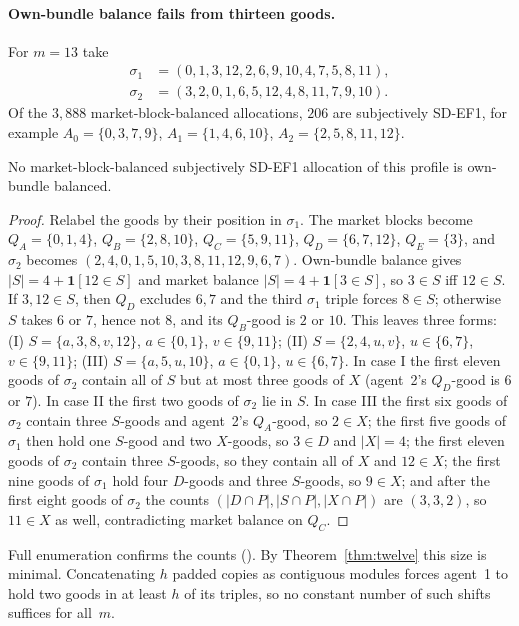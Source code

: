 \documentclass[sigconf,anonymous]{aamas}
\begin{document}
\paragraph{Own-bundle balance fails from thirteen goods.}
For $m=13$ take
\begin{align*}
 \sigma_1&=(0,1,3,12,2,6,9,10,4,7,5,8,11),\\
 \sigma_2&=(3,2,0,1,6,5,12,4,8,11,7,9,10).
\end{align*}
Of the $3{,}888$ market-block-balanced allocations, $206$ are subjectively SD-EF1, for example $A_0=\{0,3,7,9\}$, $A_1=\{1,4,6,10\}$, $A_2=\{2,5,8,11,12\}$.
\begin{proposition}\label{prop:thirteen}
No market-block-balanced subjectively SD-EF1 allocation of this profile is own-bundle balanced.
\end{proposition}
\begin{proof}
Relabel the goods by their position in $\sigma_1$. The market blocks become $Q_A=\{0,1,4\}$, $Q_B=\{2,8,10\}$, $Q_C=\{5,9,11\}$, $Q_D=\{6,7,12\}$, $Q_E=\{3\}$, and $\sigma_2$ becomes $(2,4,0,1,5,10,3,8,11,12,9,6,7)$. Own-bundle balance gives $|S|=4+\mathbf 1[12\in S]$ and market balance $|S|=4+\mathbf 1[3\in S]$, so $3\in S$ iff $12\in S$. If $3,12\in S$, then $Q_D$ excludes $6,7$ and the third $\sigma_1$ triple forces $8\in S$; otherwise $S$ takes $6$ or $7$, hence not $8$, and its $Q_B$-good is $2$ or $10$. This leaves three forms: (I) $S=\{a,3,8,v,12\}$, $a\in\{0,1\}$, $v\in\{9,11\}$; (II) $S=\{2,4,u,v\}$, $u\in\{6,7\}$, $v\in\{9,11\}$; (III) $S=\{a,5,u,10\}$, $a\in\{0,1\}$, $u\in\{6,7\}$. In case I the first eleven goods of $\sigma_2$ contain all of $S$ but at most three goods of $X$ (agent~2's $Q_D$-good is $6$ or $7$). In case II the first two goods of $\sigma_2$ lie in $S$. In case III the first six goods of $\sigma_2$ contain three $S$-goods and agent~2's $Q_A$-good, so $2\in X$; the first five goods of $\sigma_1$ then hold one $S$-good and two $X$-goods, so $3\in D$ and $|X|=4$; the first eleven goods of $\sigma_2$ contain three $S$-goods, so they contain all of $X$ and $12\in X$; the first nine goods of $\sigma_1$ hold four $D$-goods and three $S$-goods, so $9\in X$; and after the first eight goods of $\sigma_2$ the counts $(|D\cap P|,|S\cap P|,|X\cap P|)$ are $(3,3,2)$, so $11\in X$ as well, contradicting market balance on $Q_C$.
\end{proof}
Full enumeration confirms the counts (\appFifteen). By Theorem~\ref{thm:twelve} this size is minimal. Concatenating $h$ padded copies as contiguous modules forces agent~1 to hold two goods in at least $h$ of its triples, so no constant number of such shifts suffices for all~$m$.
\end{document}
